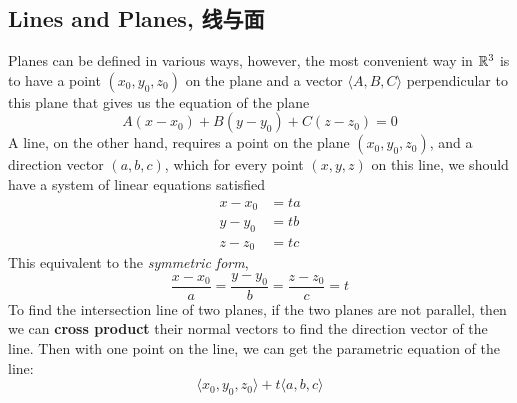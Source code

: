 \subsection{Lines and Planes, 线与面}
Planes can be defined in various ways, however, the most convenient way in $\mathbb{R}^3$ is to have a point $(x_0, y_0, z_0)$ on the plane and a vector $\langle A, B, C \rangle$ perpendicular to this plane that gives us the equation of the plane
$$A(x-x_0) + B(y-y_0) + C(z-z_0) = 0$$
A line, on the other hand, requires a point on the plane $(x_0, y_0, z_0)$, and a direction vector $(a, b, c)$, which for every point $(x, y, z)$ on this line, we should have a system of linear equations satisfied
\begin{align*}
    x - x_0 &= ta \\
    y - y_0 &= tb \\
    z - z_0 &= tc
\end{align*}
This equivalent to the \textit{symmetric form},
$$\frac{x-x_0}{a} = \frac{y-y_0}{b} = \frac{z-z_0}{c} = t$$
To find the intersection line of two planes, if the two planes are not parallel, then we can \textbf{cross product} their normal vectors to find the direction vector of the line. Then with one point on the line, we can get the parametric equation of the line:
$$\langle x_0, y_0, z_0 \rangle + t \langle a, b, c \rangle$$

